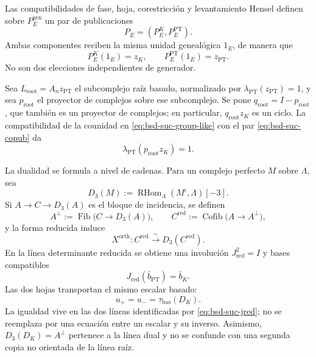 Las compatibilidades de fase, hoja, corestricción y levantamiento Hensel
definen sobre \(P_E^{\mathrm{gen}}\) un par de publicaciones
\begin{equation}\label{eq:bsd-suc-copub}
 P_E=(P_E^{K},P_E^{\mathrm{PT}}).
\end{equation}
Ambas componentes reciben la misma unidad genealógica \(1_E\), de manera
que
\begin{equation}\label{eq:bsd-suc-zk-zpt}
 P_E^{K}(1_E)=z_K,
 \qquad P_E^{\mathrm{PT}}(1_E)=z_{\mathrm{PT}}.
\end{equation}
No son dos elecciones independientes de generador.

Sea \(L_{\mathrm{root}}=A_n z_{\mathrm{PT}}\) el subcomplejo raíz basado,
normalizado por
\(\lambda_{\mathrm{PT}}(z_{\mathrm{PT}})=1\), y sea
\(p_{\mathrm{root}}\) el proyector de complejos sobre ese subcomplejo. Se pone
\(q_{\mathrm{root}}=I-p_{\mathrm{root}}\), que también es un proyector de
complejos; en particular, \(q_{\mathrm{root}}z_K\) es un ciclo. La compatibilidad de la
counidad en \eqref{eq:bsd-suc-group-like} con el par
\eqref{eq:bsd-suc-copub} da
\begin{equation}\label{eq:bsd-suc-normalizacion-raiz}
 \lambda_{\mathrm{PT}}(p_{\mathrm{root}}z_K)=1.
\end{equation}

La dualidad se formula a nivel de cadenas. Para un complejo perfecto
\(M\) sobre \(\Lambda\), sea
\begin{equation}\label{eq:bsd-suc-d3}
 D_3(M):=
 \operatorname{RHom}_{\Lambda}(M^{\iota},\Lambda)[-3].
\end{equation}
Si \(A\to C\to D_3(A)\) es el bloque de incidencia, se definen
\begin{equation}\label{eq:bsd-suc-orth-red}
 A^{\perp}:=\operatorname{Fib}\bigl(C\to D_3(A)\bigr),
 \qquad
 C^{\mathrm{red}}:=\operatorname{Cofib}\bigl(A\to A^{\perp}\bigr),
\end{equation}
y la forma reducida induce
\begin{equation}\label{eq:bsd-suc-xorth}
 X^{\mathrm{orth}}:C^{\mathrm{red}}
 \xrightarrow{\ \sim\ }D_3(C^{\mathrm{red}}).
\end{equation}
En la línea determinante reducida se obtiene una involución
\(J_{\mathrm{red}}^2=I\) y bases compatibles
\begin{equation}\label{eq:bsd-suc-jred}
 J_{\mathrm{red}}(\bar b_{\mathrm{PT}})=\bar b_K.
\end{equation}
Las dos hojas transportan el mismo escalar basado:
\begin{equation}\label{eq:bsd-suc-doble-hoja}
 u_{+}=u_{-}=\tau_{\mathrm{bas}}(D_K).
\end{equation}
La igualdad vive en las dos líneas identificadas por
\eqref{eq:bsd-suc-jred}; no se reemplaza por una ecuación entre un escalar y
su inverso. Asimismo, \(D_3(D_K)=A^{\perp}\) pertenece a la línea dual y no
se confunde con una segunda copia no orientada de la línea raíz.

